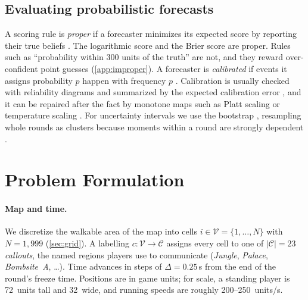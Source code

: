 \documentclass[11pt]{article}
\newcommand{\1}{\mathbb{1}}
\begin{document}
\subsection{Evaluating probabilistic forecasts}
A scoring rule is \emph{proper} if a forecaster minimizes its expected score by reporting their true beliefs \citep{gneiting2007strictly}. The logarithmic score \citep{good1952rational} and the Brier score \citep{brier1950verification} are proper. Rules such as ``probability within 300 units of the truth'' are not, and they reward over-confident point guesses (\cref{app:improper}). A forecaster is \emph{calibrated} if events it assigns probability $p$ happen with frequency $p$ \citep{degroot1983comparison}. Calibration is usually checked with reliability diagrams and summarized by the expected calibration error \citep{naeini2015obtaining}, and it can be repaired after the fact by monotone maps such as Platt scaling \citep{platt2000probabilities} or temperature scaling \citep{guo2017calibration}. For uncertainty intervals we use the bootstrap \citep{efron1979bootstrap,efron1993introduction}, resampling whole rounds as clusters because moments within a round are strongly dependent \citep{field2007bootstrapping}.

\section{Problem Formulation}
\label{sec:problem}

\paragraph{Map and time.} We discretize the walkable area of the map into cells $i \in \mathcal{V} = \{1, \dots, N\}$ with $N = 1{,}999$ (\cref{sec:grid}). A labelling $c: \mathcal{V} \to \mathcal{C}$ assigns every cell to one of $|\mathcal{C}| = 23$ \emph{callouts}, the named regions players use to communicate (\emph{Jungle}, \emph{Palace}, \emph{Bombsite~A}, \dots). Time advances in steps of $\Delta = 0.25$\,s from the end of the round's freeze time. Positions are in game units; for scale, a standing player is 72~units tall and 32~wide, and running speeds are roughly 200--250~units/s.
\end{document}
